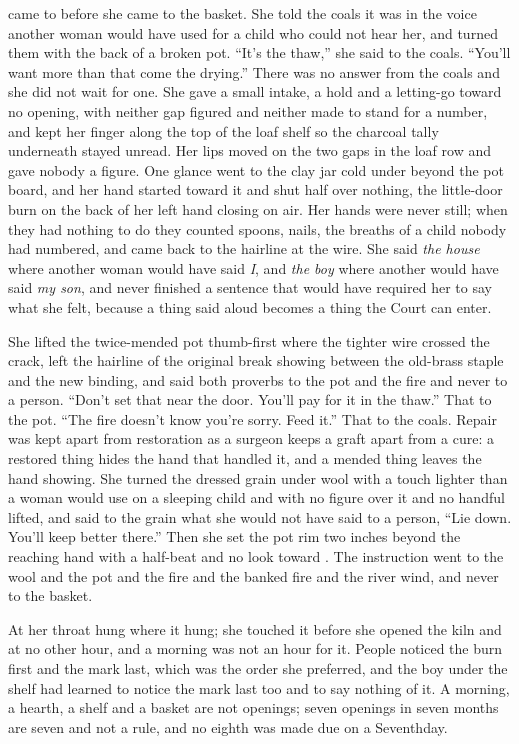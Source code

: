  came to  before she came to the basket. She told the coals it was  in the voice another woman would have used for a child who could not hear her, and turned them with the back of a broken pot. “It's the thaw,” she said to the coals. “You'll want more than that come the drying.” There was no answer from the coals and she did not wait for one. She gave a small intake, a hold and a letting-go toward no opening, with neither gap figured and neither made to stand for a number, and kept her finger along the top of the loaf shelf so the charcoal tally underneath stayed unread. Her lips moved on the two gaps in the loaf row and gave nobody a figure. One glance went to the clay jar cold under  beyond the pot board, and her hand started toward it and shut half over nothing, the little-door burn on the back of her left hand closing on air. Her hands were never still; when they had nothing to do they counted spoons, nails, the breaths of a child nobody had numbered, and came back to the hairline at the wire. She said \emph{the house} where another woman would have said \emph{I}, and \emph{the boy} where another would have said \emph{my son}, and never finished a sentence that would have required her to say what she felt, because a thing said aloud becomes a thing the Court can enter.

She lifted the twice-mended pot thumb-first where the tighter wire crossed the crack, left the hairline of the original break showing between the old-brass staple and the new binding, and said both proverbs to the pot and the fire and never to a person. “Don't set that near the door. You'll pay for it in the thaw.” That to the pot. “The fire doesn't know you're sorry. Feed it.” That to the coals. Repair was kept apart from restoration as a surgeon keeps a graft apart from a cure: a restored thing hides the hand that handled it, and a mended thing leaves the hand showing. She turned the dressed grain under wool with a touch lighter than a woman would use on a sleeping child and with no figure over it and no handful lifted, and said to the grain what she would not have said to a person, “Lie down. You'll keep better there.” Then she set the pot rim two inches beyond the reaching hand with a half-beat and no look toward . The instruction went to the wool and the pot and the fire and the banked fire and the river wind, and never to the basket.

At her throat  hung where it hung; she touched it before she opened the kiln and at no other hour, and a morning was not an hour for it. People noticed the burn first and the mark last, which was the order she preferred, and the boy under the shelf had learned to notice the mark last too and to say nothing of it. A morning, a hearth, a shelf and a basket are not openings; seven openings in seven months are seven and not a rule, and no eighth was made due on a Seventhday.

